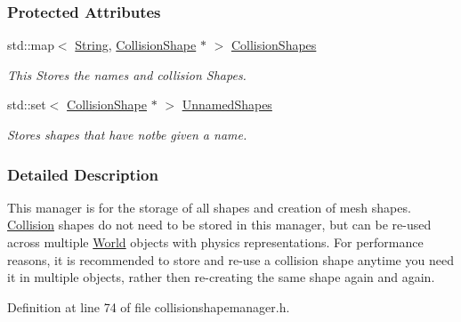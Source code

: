\subsubsection*{Protected Attributes}
\begin{DoxyCompactItemize}
\item 
\hypertarget{classMezzanine_1_1CollisionShapeManager_abbb1fe3fe33590c524d9b43629530171}{
std::map$<$ \hyperlink{namespaceMezzanine_acf9fcc130e6ebf08e3d8491aebcf1c86}{String}, \hyperlink{classMezzanine_1_1CollisionShape}{CollisionShape} $\ast$ $>$ \hyperlink{classMezzanine_1_1CollisionShapeManager_abbb1fe3fe33590c524d9b43629530171}{CollisionShapes}}
\label{classMezzanine_1_1CollisionShapeManager_abbb1fe3fe33590c524d9b43629530171}

\begin{DoxyCompactList}\small\item\em This Stores the names and collision Shapes. \item\end{DoxyCompactList}\item 
\hypertarget{classMezzanine_1_1CollisionShapeManager_ab54d750482b016f93b2800323592e779}{
std::set$<$ \hyperlink{classMezzanine_1_1CollisionShape}{CollisionShape} $\ast$ $>$ \hyperlink{classMezzanine_1_1CollisionShapeManager_ab54d750482b016f93b2800323592e779}{UnnamedShapes}}
\label{classMezzanine_1_1CollisionShapeManager_ab54d750482b016f93b2800323592e779}

\begin{DoxyCompactList}\small\item\em Stores shapes that have notbe given a name. \item\end{DoxyCompactList}\end{DoxyCompactItemize}


\subsubsection{Detailed Description}
This manager is for the storage of all shapes and creation of mesh shapes. \hyperlink{classMezzanine_1_1Collision}{Collision} shapes do not need to be stored in this manager, but can be re-\/used across multiple \hyperlink{classMezzanine_1_1World}{World} objects with physics representations. For performance reasons, it is recommended to store and re-\/use a collision shape anytime you need it in multiple objects, rather then re-\/creating the same shape again and again. 

Definition at line 74 of file collisionshapemanager.h.



